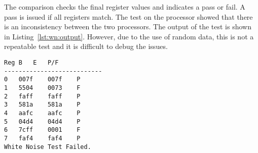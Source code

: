 The comparison checks the final register values and indicates a pass or fail. 
A pass is issued if all registers match. 
The test on the processor showed that there is an inconsistency between the two processors. 
The output of the test is shown in Listing~\ref{lst:wn:output}.
However, due to the use of random data, this is not a repeatable test and it is difficult to debug the issues. 



\begin{lstlisting}[label=lst:wn:output,caption={Output of the white noise test}]
Reg	B	E	P/F
---------------------------
0	007f	007f	P
1	5504	0073	F
2	faff	faff	P
3	581a	581a	P
4	aafc	aafc	P
5	04d4	04d4	P
6	7cff	0001	F
7	faf4	faf4	P
White Noise Test Failed.
\end{lstlisting}

